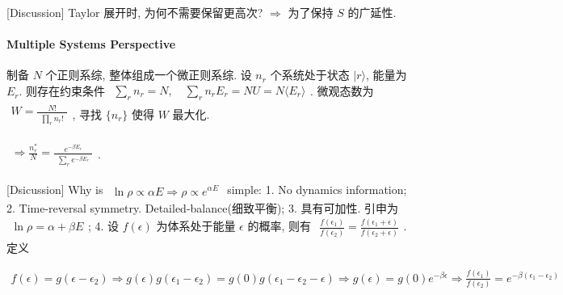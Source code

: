 \documentclass[../../main.tex]{subfiles}
\begin{document}
[Discussion] Taylor 展开时, 为何不需要保留更高次? $\Rightarrow$ 为了保持 $S$ 的广延性. 

\paragraph{Multiple Systems Perspective} 

制备 $N$ 个正则系综, 整体组成一个微正则系综. 设 $n_{r}$ 个系统处于状态 $|r\rangle$, 能量为 $E_{r}$. 则存在约束条件 $\begin{aligned}
    \sum_{r}n_{r} = N,\quad \sum_{r}n_{r}E_{r} = NU = N\langle E_{r}\rangle
\end{aligned}$. 微观态数为 $\begin{aligned}
    W = \frac{N!}{\begin{aligned}
        \prod_{r}n_{r}!
    \end{aligned}}
\end{aligned}$, 寻找 $\{n_{r}\}$ 使得 $W$ 最大化. 

$\begin{aligned}
    \Rightarrow\frac{n_{r}^{*}}{N} = \frac{e^{-\beta E_{r}}}{\begin{aligned}
        \sum_{r}e^{-\beta E_{r}}
    \end{aligned}}
\end{aligned}$. 

[Dsicussion] Why is $\begin{aligned}
    \ln{\rho}\propto \alpha E\Rightarrow \rho\propto e^{\alpha E}
\end{aligned}$ simple: 1. No dynamics information; 2. Time-reversal symmetry. Detailed-balance(细致平衡); 3. 具有可加性. 引申为 $\begin{aligned}
    \ln{\rho} = \alpha + \beta E
\end{aligned}$; 4. 设 $f(\epsilon)$ 为体系处于能量 $\epsilon$ 的概率, 则有 $\begin{aligned}
    \frac{f(\epsilon_{1})}{f(\epsilon_{2})} = \frac{f(\epsilon_{1}+\epsilon)}{f(\epsilon_{2}+\epsilon)}
\end{aligned}$. 定义

$\begin{aligned}
    f(\epsilon) = g(\epsilon - \epsilon_{2})\Rightarrow g(\epsilon) g(\epsilon_{1} - \epsilon_{2})= g(0)g(\epsilon_{1} - \epsilon_{2}-\epsilon)\Rightarrow g(\epsilon) = g(0)e^{-\beta \epsilon}\Rightarrow \frac{f(\epsilon_{1})}{f(\epsilon_{2})} = e^{-\beta(\epsilon_{1}-\epsilon_{2})}
\end{aligned}$
\end{document}
